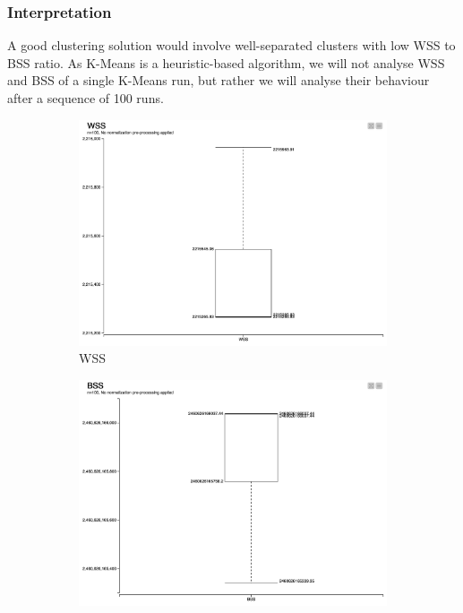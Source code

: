 \documentclass[11pt]{article}
\begin{document}
			\subsubsection*{Interpretation}
				A good clustering solution would involve well-separated clusters with low WSS to BSS ratio\cite{7}. As K-Means is a heuristic-based algorithm, we will not analyse WSS and BSS of a single K-Means run, but rather we will analyse their behaviour after a sequence of 100 runs. 
				\iftrue
				\begin{figure}[H]
					
					\centering
					\begin{subfigure}{0.4\textwidth}
						\includegraphics[width=\textwidth]{res/t1/t15/t15-WSS-plot}
						\caption{WSS}
						\label{fig:first}
					\end{subfigure}
					\hfill
					\begin{subfigure}{0.4\textwidth}
						\includegraphics[width=\textwidth]{res/t1/t15/t15-BSS-plot}

\end{subfigure}
\end{figure}
\end{document}

